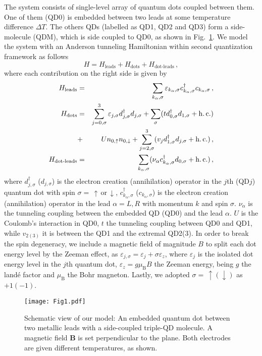 \documentclass[aps,twocolumn,prb,superscript,floatfix,superscriptaddress,showpacs]{revtex4-1}
\newcommand{\ve}{\varepsilon}
\begin{document}
The system consists of single-level array of quantum dots coupled between them. One of them (QD0) is embedded between two leads at some temperature difference $\Delta T$. The others QDs (labelled as QD1, QD2 and QD3) form a side-molecule (QDM), which is side coupled to QD0, as shown in Fig.\ \ref{Model}. We model the system with an Anderson tunneling Hamiltonian within second quantization framework as follows
\begin{equation}
H=H_{\text{leads}}+H_{\text{dots}}+H_{\text{dot-leads}}\,, \label{H}
\end{equation}
where each contribution on the right side is given by
\begin{eqnarray}
H_{\text{leads}}&=&\sum_{k_{\alpha},\sigma}\ve_{k_{\alpha},\sigma}c_{k_{\alpha},\sigma}^{\dag}c_{k_{\alpha},\sigma}\,, \label{Hleads}\\
H_{\text{dots}}&=&\sum_{j=0,\sigma}^{3}\ve_{j,\sigma}d_{j,\sigma}^{\dag}d_{j,\sigma}+\sum_{\sigma}(t d_{0,\sigma}^{\dag}d_{1,\sigma}+\text{h.\,c.}) \nonumber \\
&+&Un_{0,\uparrow}n_{0,\downarrow}+\sum_{j=2,\sigma}^{3}(v_{j}d_{1,\sigma}^{\dag}d_{j,\sigma}+\text{h.\,c.})\,,\label{Hdots} \\
H_{\text{dot-leads}}&=&\sum_{k_{\alpha},\sigma}(\nu_{\alpha}c_{k_{\alpha},\sigma}^{\dag}d_{0,\sigma}+\text{h.\,c.}) \label{Hdotleads}\,,
\end{eqnarray}
where $d_{j,\sigma}^{\dag}$ ($d_{j,\sigma}$) is the electron creation (annihilation) operator in the $j$th (QD$j$) quantum dot with spin $\sigma=\,\uparrow\,\text{or}\,\downarrow$, $c_{k_{\alpha},\sigma}^{\dag}$ ($c_{k_{\alpha},\sigma}$) is the electron creation (annihilation) operator in the lead $\alpha=L,R$ with momentum $k$ and spin $\sigma$. $\nu_{\alpha}$ is the tunneling coupling between the embedded QD (QD0) and the lead $\alpha$. $U$ is the Coulomb's interaction in QD0, $t$ the tunneling coupling between QD0 and QD1, while $v_{2(3)}$ it is between the QD1 and the extremal QD2(3). In order to break the spin degeneracy, we include a magnetic field of magnitude $B$ to split each dot energy level by the Zeeman effect, as $\ve_{j,\sigma}=\ve_{j}+\sigma\ve_{z}$, where $\ve_{j}$ is the isolated dot energy level in the $j$th quantum dot, $\ve_{z}=g\mu_{\text{B}}B$ the Zeeman energy, being $g$ the land\'{e} factor and $\mu_{\text{B}}$ the Bohr magneton. Lastly, we adopted $\sigma=\,\uparrow(\downarrow)$ as $+1(-1)$.

\begin{figure}[tbph]
\centering
\texttt{[image: Fig1.pdf]}
\caption{Schematic view of our model: An embedded quantum dot between two metallic leads with a side-coupled triple-QD molecule. A magnetic field $\textbf{B}$ is set perpendicular to the plane. Both electrodes are given different temperatures, as shown.}
\label{Model}
\end{figure}
\end{document}
